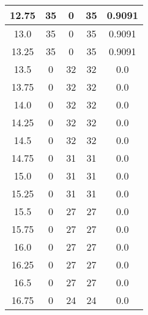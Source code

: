 \documentclass[letterpaper, 12pt]{article}
\begin{document}
\begin{longtable}{|c|c|c|c|c|}
\hline
12.75 & 35 & 0 & 35 & 0.9091 \\
\hline
13.0 & 35 & 0 & 35 & 0.9091 \\
\hline
13.25 & 35 & 0 & 35 & 0.9091 \\
\hline
13.5 & 0 & 32 & 32 & 0.0 \\
\hline
13.75 & 0 & 32 & 32 & 0.0 \\
\hline
14.0 & 0 & 32 & 32 & 0.0 \\
\hline
14.25 & 0 & 32 & 32 & 0.0 \\
\hline
14.5 & 0 & 32 & 32 & 0.0 \\
\hline
14.75 & 0 & 31 & 31 & 0.0 \\
\hline
15.0 & 0 & 31 & 31 & 0.0 \\
\hline
15.25 & 0 & 31 & 31 & 0.0 \\
\hline
15.5 & 0 & 27 & 27 & 0.0 \\
\hline
15.75 & 0 & 27 & 27 & 0.0 \\
\hline
16.0 & 0 & 27 & 27 & 0.0 \\
\hline
16.25 & 0 & 27 & 27 & 0.0 \\
\hline
16.5 & 0 & 27 & 27 & 0.0 \\
\hline
16.75 & 0 & 24 & 24 & 0.0 \\
\hline
\end{longtable}
\end{document}
